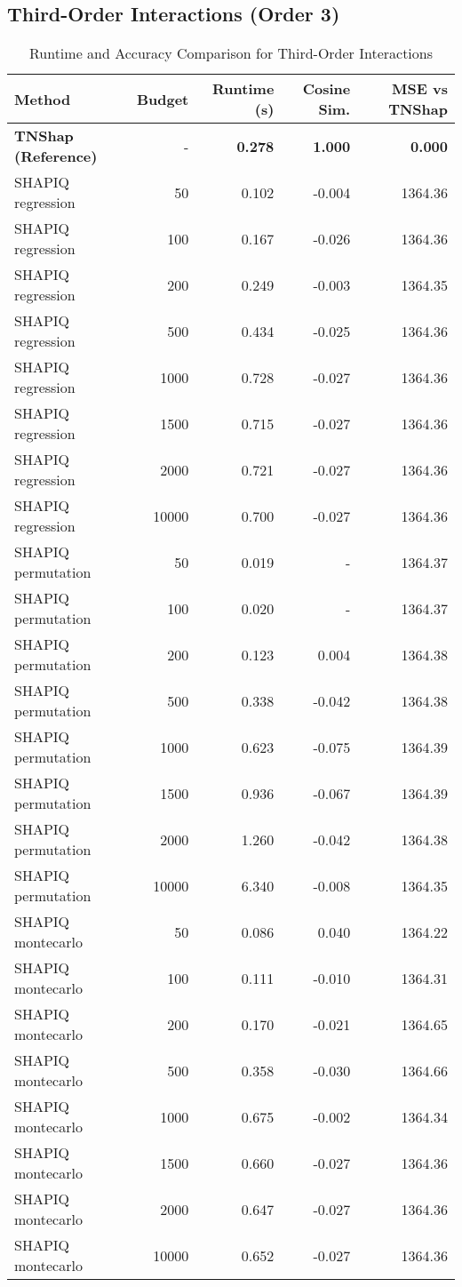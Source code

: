 \documentclass{article}
\begin{document}
\subsection{Third-Order Interactions (Order 3)}

\begin{table}[h!]
\centering
\caption{Runtime and Accuracy Comparison for Third-Order Interactions}
\label{tab:order3}
\small
\begin{tabular}{lrrrr}
\toprule
\textbf{Method} & \textbf{Budget} & \textbf{Runtime (s)} & \textbf{Cosine Sim.} & \textbf{MSE vs TNShap} \\
\midrule
\rowcolor{green!10}
\textbf{TNShap (Reference)} & - & \textbf{0.278} & \textbf{1.000} & \textbf{0.000} \\
\midrule
SHAPIQ regression & 50 & 0.102 & -0.004 & 1364.36 \\
SHAPIQ regression & 100 & 0.167 & -0.026 & 1364.36 \\
SHAPIQ regression & 200 & 0.249 & -0.003 & 1364.35 \\
SHAPIQ regression & 500 & 0.434 & -0.025 & 1364.36 \\
SHAPIQ regression & 1000 & 0.728 & -0.027 & 1364.36 \\
SHAPIQ regression & 1500 & 0.715 & -0.027 & 1364.36 \\
SHAPIQ regression & 2000 & 0.721 & -0.027 & 1364.36 \\
SHAPIQ regression & 10000 & 0.700 & -0.027 & 1364.36 \\
\midrule
SHAPIQ permutation & 50 & 0.019 & - & 1364.37 \\
SHAPIQ permutation & 100 & 0.020 & - & 1364.37 \\
SHAPIQ permutation & 200 & 0.123 & 0.004 & 1364.38 \\
SHAPIQ permutation & 500 & 0.338 & -0.042 & 1364.38 \\
SHAPIQ permutation & 1000 & 0.623 & -0.075 & 1364.39 \\
SHAPIQ permutation & 1500 & 0.936 & -0.067 & 1364.39 \\
SHAPIQ permutation & 2000 & 1.260 & -0.042 & 1364.38 \\
SHAPIQ permutation & 10000 & 6.340 & -0.008 & 1364.35 \\
\midrule
SHAPIQ montecarlo & 50 & 0.086 & 0.040 & 1364.22 \\
SHAPIQ montecarlo & 100 & 0.111 & -0.010 & 1364.31 \\
SHAPIQ montecarlo & 200 & 0.170 & -0.021 & 1364.65 \\
SHAPIQ montecarlo & 500 & 0.358 & -0.030 & 1364.66 \\
SHAPIQ montecarlo & 1000 & 0.675 & -0.002 & 1364.34 \\
SHAPIQ montecarlo & 1500 & 0.660 & -0.027 & 1364.36 \\
SHAPIQ montecarlo & 2000 & 0.647 & -0.027 & 1364.36 \\
SHAPIQ montecarlo & 10000 & 0.652 & -0.027 & 1364.36 \\
\bottomrule
\end{tabular}
\end{table}
\end{document}
